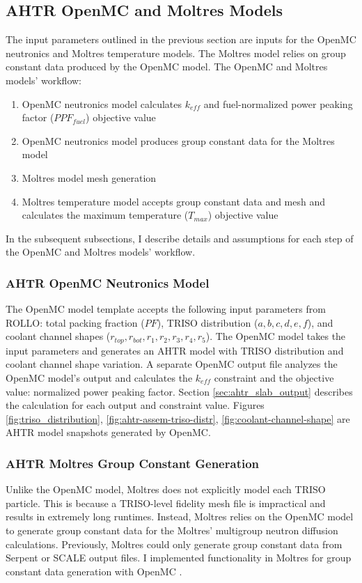 \subsection{AHTR OpenMC and Moltres Models}
\label{sec:ahtr-moltres-hom}
The input parameters outlined in the previous section are inputs for 
the OpenMC neutronics and Moltres temperature models. 
The Moltres model relies on group constant data produced by the OpenMC model. 
The OpenMC and Moltres models' workflow:  
\begin{enumerate}
\item OpenMC neutronics model calculates $k_{eff}$ and fuel-normalized 
power peaking factor ($PPF_{fuel}$) objective value
\item OpenMC neutronics model produces group constant data for the Moltres 
model
\item Moltres model mesh generation 
\item Moltres temperature model accepts group constant data and mesh and calculates 
      the maximum temperature ($T_{max}$) objective value
\end{enumerate}
In the subsequent subsections, I describe details and assumptions for each step of 
the OpenMC and Moltres models' workflow.

\subsubsection{AHTR OpenMC Neutronics Model}
The OpenMC model template accepts the following input parameters from \gls{ROLLO}: 
total packing fraction ($PF$), TRISO distribution ($a, b, c, d, e, f$), 
and coolant channel shapes ($r_{top}, r_{bot}, r_1, r_2, r_3, r_4, r_5$). 
The OpenMC model takes the input parameters and generates an \gls{AHTR} model with 
\gls{TRISO} distribution and coolant channel shape variation. 
A separate OpenMC output file analyzes the OpenMC model's output and 
calculates the $k_{eff}$ constraint and the objective value: normalized power 
peaking factor.
Section \ref{sec:ahtr_slab_output} describes the calculation for each output and 
constraint value.
Figures \ref{fig:triso_distribution}, \ref{fig:ahtr-assem-triso-distr},
\ref{fig:coolant-channel-shape} are \gls{AHTR} model snapshots generated by OpenMC. 

\subsubsection{AHTR Moltres Group Constant Generation}
\label{sec:ahtr-moltres-group-constant-gen}
Unlike the OpenMC model, Moltres does not explicitly model each \gls{TRISO}
particle. 
This is because a TRISO-level fidelity mesh file is impractical and results in
extremely long runtimes. 
Instead, Moltres relies on the OpenMC model to generate group constant data for the 
Moltres' multigroup neutron diffusion calculations. 
Previously, Moltres could only generate group constant data from Serpent 
\cite{leppanen_serpent_2014} or SCALE \cite{bucholz_scale:_1982} output files. 
I implemented functionality in Moltres for group constant data generation with 
OpenMC \cite{lindsay_moltres_2017}. 

